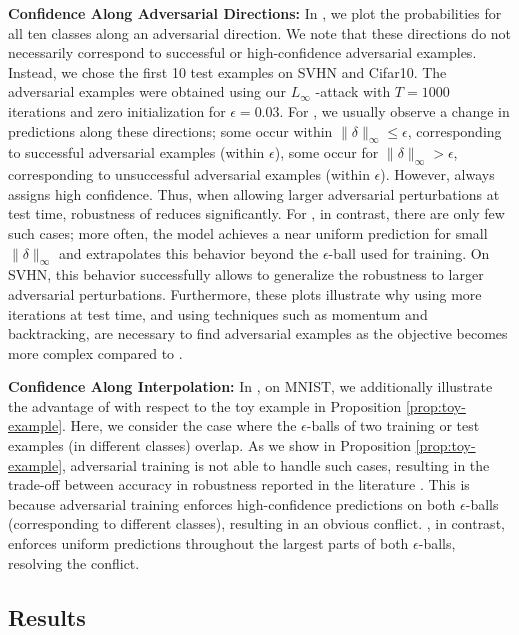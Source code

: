 \textbf{Confidence Along Adversarial Directions:}
%
In , we plot the probabilities for all ten classes along an adversarial direction. We note that these directions do not necessarily correspond to successful or high-confidence adversarial examples. Instead, we chose the first 10 test examples on SVHN and Cifar10. The adversarial examples were obtained using our $L_\infty$ \PGD-\FConf attack with $T = 1000$ iterations and zero initialization for $\epsilon = 0.03$. For \AdvTrain, we usually observe a change in predictions along these directions; some occur within $\|\delta\|_\infty \leq \epsilon$, corresponding to successful adversarial examples (within $\epsilon$), some occur for $\|\delta\|_\infty > \epsilon$, corresponding to unsuccessful adversarial examples (within $\epsilon$). However, \AdvTrain always assigns high confidence. Thus, when allowing larger adversarial perturbations at test time, robustness of \AdvTrain reduces significantly. For \ConfTrain, in contrast, there are only few such cases; more often, the model achieves a near uniform prediction for small $\|\delta\|_\infty$ and extrapolates this behavior beyond the $\epsilon$-ball used for training. On SVHN, this behavior successfully allows to generalize the robustness to larger adversarial perturbations. Furthermore, these plots illustrate why using more iterations at test time, and using techniques such as momentum and backtracking, are necessary to find adversarial examples as the objective becomes more complex compared to \AdvTrain.

\textbf{Confidence Along Interpolation:}
%
In , on MNIST, we additionally illustrate the advantage of \ConfTrain with respect to the toy example in Proposition \ref{prop:toy-example}. Here, we consider the case where the $\epsilon$-balls of two training or test examples (in different classes) overlap. As we show in Proposition \ref{prop:toy-example}, adversarial training is not able to handle such cases, resulting in the  trade-off between accuracy in robustness reported in the literature \citep{TsiprasARXIV2018,StutzCVPR2019,RaghunathanARXIV2019,ZhangICML2019}. This is because adversarial training enforces high-confidence predictions on both $\epsilon$-balls (corresponding to different classes), resulting in an obvious conflict. \ConfTrain, in contrast, enforces uniform predictions throughout the largest parts of both $\epsilon$-balls, resolving the conflict.

\subsection{Results}
\label{subsec:supp-experiments-results}

